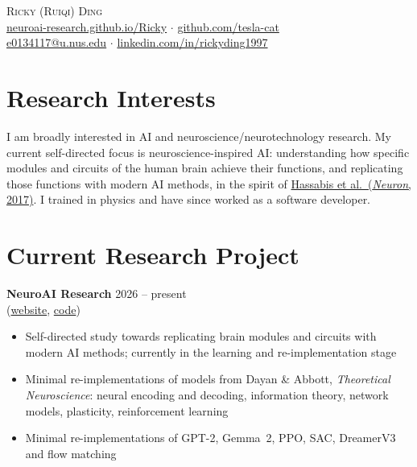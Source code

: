\documentclass[11pt,a4paper]{article}
\begin{document}
\begin{center}
  {\LARGE \textsc{Ricky (Ruiqi) Ding}}\\[4pt]
  \href{https://neuroai-research.github.io/Ricky/}{neuroai-research.github.io/Ricky}
  \;$\cdot$\; \href{https://github.com/tesla-cat}{github.com/tesla-cat}\\
  \href{mailto:e0134117@u.nus.edu}{e0134117@u.nus.edu}
  \;$\cdot$\; \href{https://www.linkedin.com/in/rickyding1997}{linkedin.com/in/rickyding1997}
\end{center}

\section{Research Interests}

I am broadly interested in AI and neuroscience/neurotechnology research. My
current self-directed focus is neuroscience-inspired AI: understanding how
specific modules and circuits of the human brain achieve their functions, and
replicating those functions with modern AI methods, in the spirit of
\href{https://doi.org/10.1016/j.neuron.2017.06.011}{Hassabis et al.\ (\textit{Neuron}, 2017)}.
I trained in physics and have since worked as a software developer.

\section{Current Research Project}

\textbf{NeuroAI Research} \hfill 2026 -- present\\
(\href{https://neuroai-research.github.io/}{website},
\href{https://github.com/NeuroAI-Research/neu-ai}{code})
\begin{itemize}
  \item Self-directed study towards replicating brain modules and circuits
        with modern AI methods; currently in the learning and
        re-implementation stage
  \item Minimal re-implementations of models from Dayan \& Abbott,
        \textit{Theoretical Neuroscience}: neural encoding and decoding,
        information theory, network models, plasticity, reinforcement learning
  \item Minimal re-implementations of GPT-2, Gemma~2, PPO, SAC, DreamerV3
        and flow matching
\end{itemize}
\end{document}
